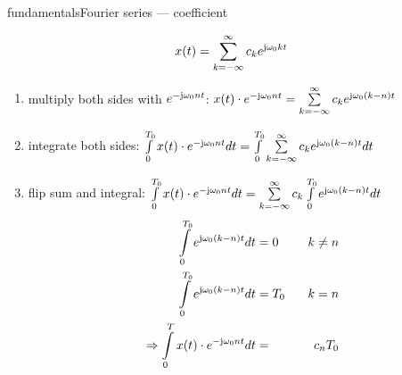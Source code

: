 \begin{frame}{fundamentals}{Fourier series --- coefficient}
    \vspace{-5mm}
    \begin{footnotesize}
    \begin{equation}\nonumber
       x(t) = \sum\limits_{k=-\infty}^{\infty} c_k e^{\mathrm{j}\omega_0kt}
    \end{equation}
    \begin{enumerate}
        \item   multiply both sides with $e^{-\mathrm{j}\omega_0nt}$: $x(t)\cdot e^{-\mathrm{j}\omega_0nt} = \sum\limits_{k=-\infty}^{\infty} c_k e^{\mathrm{j}\omega_0(k-n)t}$
        \item   integrate both sides: $\int\limits_0^{T_0}{x(t)\cdot e^{-\mathrm{j}\omega_0nt}}dt = \int\limits_0^{T_0}\sum\limits_{k=-\infty}^{\infty} c_k e^{\mathrm{j}\omega_0(k-n)t}dt$
        \item   flip sum and integral: $ \int\limits_0^{T_0}{x(t)\cdot e^{-\mathrm{j}\omega_0nt}}dt = \sum\limits_{k=-\infty}^{\infty}c_k \int\limits_0^{T_0} e^{\mathrm{j}\omega_0(k-n)t}dt$
        \begin{eqnarray}
            \int\limits_0^{T_0} e^{\mathrm{j}\omega_0(k-n)t}dt &= 0 &\;\;\;k\neq n\nonumber\\
            \int\limits_0^{T_0} e^{\mathrm{j}\omega_0(k-n)t}dt &= T_0 &\;\;\;k= n\nonumber\\
            \Rightarrow \int\limits_0^T{x(t)\cdot e^{-\mathrm{j}\omega_0nt}}dt &=& c_n T_0
        \end{eqnarray}
    \end{enumerate}
    \end{footnotesize}
\end{frame}
